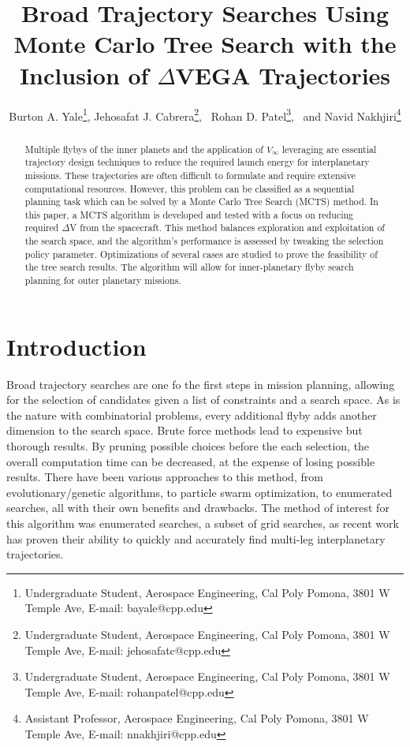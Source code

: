 \documentclass[letterpaper, preprint, paper,11pt]{AAS}	%
\begin{document}
\title{Broad Trajectory Searches Using Monte Carlo Tree Search with the Inclusion of $\Delta$VEGA Trajectories}

\author{Burton A. Yale\thanks{Undergraduate Student, Aerospace Engineering, Cal Poly Pomona, 3801 W Temple Ave, E-mail: bayale@cpp.edu},  
Jehosafat J. Cabrera\thanks{Undergraduate Student, Aerospace Engineering, Cal Poly Pomona, 3801 W Temple Ave, E-mail: jehosafatc@cpp.edu},
\ Rohan D. Patel\thanks{Undergraduate Student, Aerospace Engineering, Cal Poly Pomona, 3801 W Temple Ave, E-mail: rohanpatel@cpp.edu},
\ and Navid Nakhjiri\thanks{Assistant Professor, Aerospace Engineering, Cal Poly Pomona, 3801 W Temple Ave, E-mail: nnakhjiri@cpp.edu}
}


\maketitle{} 		


\begin{abstract}
Multiple flybys of the inner planets and the application of $V_{\infty}$ leveraging are essential trajectory design techniques to reduce the required launch energy for interplanetary missions. These trajectories are often difficult to formulate and require extensive computational resources. However, this problem can be classified as a sequential planning task which can be solved by a Monte Carlo Tree Search (MCTS) method. In this paper, a MCTS algorithm is developed and tested with a focus on reducing required $\Delta$V from the spacecraft. This method balances exploration and exploitation of the search space, and the algorithm’s performance is assessed by tweaking the selection policy parameter. Optimizations of several cases are studied to prove the feasibility of the tree search results. The algorithm will allow for inner-planetary flyby search planning for outer planetary missions.
\end{abstract}

\section{Introduction}
Broad trajectory searches are one fo the first steps in mission planning, allowing for the selection of candidates given a list of constraints and a search space. As is the nature with combinatorial problems, every additional flyby adds another dimension to the search space. Brute force methods lead to expensive but thorough results. By pruning possible choices before the each selection, the overall computation time can be decreased, at the expense of losing possible results. There have been various approaches to this method, from evolutionary/genetic algorithms, to particle swarm optimization, to enumerated searches, all with their own benefits and drawbacks. The method of interest for this algorithm was enumerated searches, a subset of grid searches, as recent work has proven their ability to quickly and accurately find multi-leg interplanetary trajectories\cite{Hennes2015}.
\end{document}
